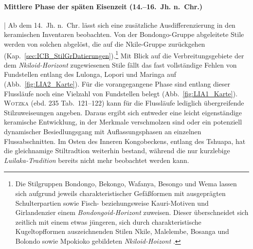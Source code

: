 \paragraph{Mittlere Phase der späten Eisenzeit (14.--16.~Jh. n.~Chr.)}\hspace{-.5em}|\hspace{.5em}%
Ab dem 14.~Jh. n.~Chr. lässt sich eine zusätzliche Ausdifferenzierung in den keramischen Inventaren beobachten. Von der Bondongo-Gruppe abgeleitete Stile werden von solchen abgelöst, die auf die Nkile-Gruppe zurückgehen (Kap.~\ref{sec:ICB_StilGrDatierungen}).\footnote{Die Stilgruppen Bondongo, Bekongo, Wafanya, Besongo und Wema lassen sich aufgrund jeweils charakteristischer Gefäßformen mit ausgeprägten Schulterpartien sowie Fisch- beziehungsweise Kauri-Motiven und Girlandenzier einem \textit{Bondongoid-Horizont} zuweisen. Dieser überschneidet sich zeitlich mit einem etwas jüngeren, sich durch charakteristische Kugeltopfformen auszeichnenden Stilen Nkile, Malelembe, Bosanga und Bolondo sowie Mpokioko gebildeten \textit{Nkiloid-Hoizont} \parencites[287\,f.]{Eggert.1983}[224\,f.; Kap.~\ref{sec:Horizonte}]{Wotzka.1995}.} Mit Blick auf die Verbreitungsgebiete der dem \textit{Nkiloid-Horizont} zugewiesenen Stile fällt das fast vollständige Fehlen von Fundstellen entlang des Lulonga, Lopori und Maringa auf (Abb.~\ref{fig:LIA2_Karte}). Für die vorangegangene Phase sind entlang dieser Flussläufe noch eine Vielzahl von Fundstellen belegt (Abb.~\ref{fig:LIA1_Karte}). \textsc{Wotzka} (ebd. 235 Tab.~121--122) kann für die Flussläufe lediglich übergreifende Stilzuweiseungen angeben. Daraus ergibt sich entweder eine leicht eigenständige keramische Entwicklung, in der Merkmale verschmolzen sind oder ein potenziell dynamischer Besiedlungsgang mit Auflassungsphasen an einzelnen Flussabschnitten. Im Osten des Inneren Kongobeckens, entlang des Tshuapa, hat die gleichnamige Stiltradtion weiterhin bestand, während die nur kurzlebige \textit{Luilaka-Tradition} bereits nicht mehr beobachtet werden kann.

